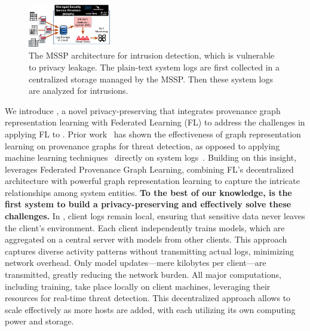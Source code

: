 \begin{figure}[t!]
  \centering
  \includegraphics[width=0.32\textwidth]{fig/mssp.pdf}
  \caption{The MSSP architecture for intrusion detection, which is vulnerable to privacy leakage. The plain-text system logs are first collected in a centralized storage managed by the MSSP. Then these system logs are analyzed for intrusions. }
  \label{mssp}
  \vspace{-4ex}
\end{figure}

\smallskip
{}
\smallskip

\noindent
We introduce \Sys, a novel privacy-preserving \pids that integrates provenance graph representation learning with Federated Learning (FL) to address the challenges in applying FL to \pids. Prior work~\cite{wang2022threatrace} has shown the effectiveness of graph representation learning on provenance graphs for threat detection, as opposed to applying machine learning techniques~\cite{chowdhary2020natural, goodfellow2020generative} directly on system logs~\cite{deeplog2017, xia2019loggan}. Building on this insight, \Sys leverages Federated Provenance Graph Learning, combining FL’s decentralized architecture with powerful graph representation learning to capture the intricate relationships among system entities. {\bf To the best of our knowledge, \Sys is the first system to build a privacy-preserving \pids and effectively solve these challenges.} In \Sys, client logs remain local, ensuring that sensitive data never leaves the client's environment. Each client independently trains \gnnshort models, which are aggregated on a central server with models from other clients. This approach captures diverse activity patterns without transmitting actual logs, minimizing network overhead. Only model updates—mere kilobytes per client—are transmitted, greatly reducing the network burden. All major computations, including training, take place locally on client machines, leveraging their resources for real-time threat detection. This decentralized approach allows \Sys to scale effectively as more hosts are added, with each utilizing its own computing power and storage.

